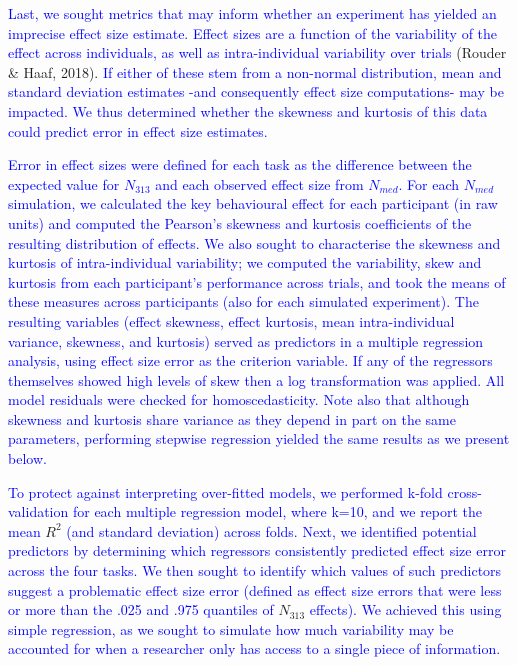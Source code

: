 \documentclass[
  man]{apa6}
\begin{document}
\textcolor{blue}{Last, we sought metrics that may inform whether an experiment has yielded an imprecise effect size estimate. Effect sizes are a function of the variability of the effect across individuals, as well as intra-individual variability over trials} (Rouder \& Haaf, 2018). \textcolor{blue}{If either of these stem from a non-normal distribution, mean and standard deviation estimates -and consequently effect size computations- may be impacted. We thus determined whether the skewness and kurtosis of this data could predict error in effect size estimates.}

\textcolor{blue}{Error in effect sizes were defined for each task as the difference between the expected value for $N_{313}$ and each observed effect size from $N_{med}$. For each $N_{med}$ simulation, we calculated the key behavioural effect for each participant (in raw units) and computed the Pearson's skewness and kurtosis coefficients of the resulting distribution of effects. We also sought to characterise the skewness and kurtosis of  intra-individual variability; we computed the variability, skew and kurtosis from each participant's performance across trials, and took the means of these measures across participants (also for each simulated experiment). The resulting variables (effect skewness, effect kurtosis, mean intra-individual variance, skewness, and kurtosis) served as predictors in a multiple regression analysis, using effect size error as the criterion variable. If any of the regressors themselves showed high levels of skew then a log transformation was applied. All model residuals were checked for homoscedasticity. Note also that although skewness and kurtosis share variance as they depend in part on the same parameters, performing stepwise regression yielded the same results as we present below.}

\textcolor{blue}{To protect against interpreting over-fitted models, we performed k-fold cross-validation for each multiple regression model, where k=10, and we report the mean} \(R^2\) \textcolor{blue}{ (and standard deviation) across folds. Next, we identified potential predictors by determining which regressors consistently predicted effect size error across the four tasks. We then sought to identify which values of such predictors suggest a problematic effect size error (defined as effect size errors that were less or more than the .025 and .975 quantiles of} \(N_{313}\) \textcolor{blue}{effects). We achieved this using simple regression, as we sought to simulate how much variability may be accounted for when a researcher only has access to a single piece of information.}
\end{document}
